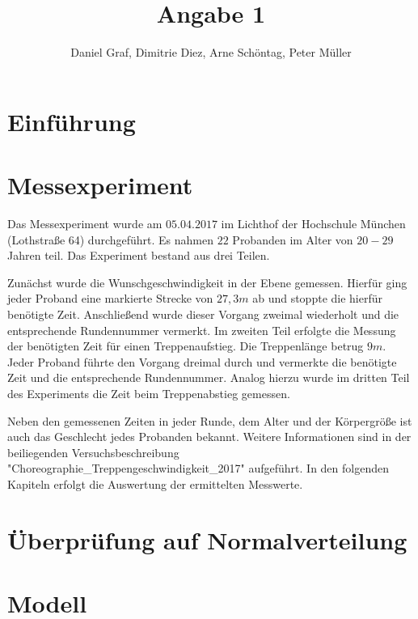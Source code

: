 
 
\title{Angabe 1}
\providecommand{\subtitle}[1]{}
\subtitle{Untertitel}
\author{Daniel Graf, Dimitrie Diez, Arne Schöntag, Peter Müller}
\date{}


\maketitle


\tableofcontents

\section{Einführung}


\section{Messexperiment}

Das Messexperiment wurde am $05.04.2017$ im Lichthof der Hochschule München (Lothstraße 64) durchgeführt. Es nahmen $22$ Probanden im Alter von $20-29$ Jahren teil. Das Experiment bestand aus drei Teilen. 

Zunächst wurde die Wunschgeschwindigkeit in der Ebene gemessen. Hierfür ging jeder Proband eine markierte Strecke von $27,3m$ ab und stoppte die hierfür benötigte Zeit. Anschließend wurde dieser Vorgang zweimal wiederholt und die entsprechende Rundennummer vermerkt. Im zweiten Teil erfolgte die Messung der benötigten Zeit für einen Treppenaufstieg. Die Treppenlänge betrug $9m$. Jeder Proband führte den Vorgang dreimal durch und vermerkte die benötigte Zeit und die entsprechende Rundennummer. Analog hierzu wurde im dritten Teil des Experiments die Zeit beim Treppenabstieg gemessen. 

Neben den gemessenen Zeiten in jeder Runde, dem Alter und der Körpergröße ist auch das Geschlecht jedes Probanden bekannt. Weitere Informationen sind in der beiliegenden Versuchsbeschreibung "Choreographie\_Treppengeschwindigkeit\_2017" aufgeführt. In den folgenden Kapiteln erfolgt die Auswertung der ermittelten Messwerte.

\section{Überprüfung auf Normalverteilung}
\section{Modell}
